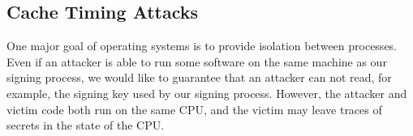 % 
% 
% 

\subsection{Cache Timing Attacks}
One major goal of operating systems is to provide isolation between processes. Even if an attacker is able to run some software on the same machine as our signing process, we would like to guarantee that an attacker can not read, for example, the signing key used by our signing process. However, the attacker and victim code both run on the same CPU, and the victim may leave traces of secrets in the state of the CPU.


